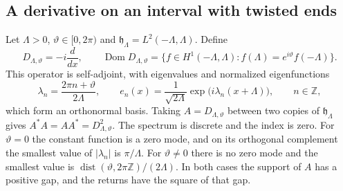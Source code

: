 \documentclass[11pt]{article}
\theoremstyle{definition}
\begin{document}
\subsection{A derivative on an interval with twisted ends}
\label{subsec:four-maps-interval}

Let $\Lambda>0$, $\vartheta\in[0,2\pi)$ and $\mathfrak h_\Lambda=L^2(-\Lambda,\Lambda)$. Define
\begin{equation}
 D_{\Lambda,\vartheta}=-i\frac{d}{dx},\qquad
 \operatorname{Dom}D_{\Lambda,\vartheta}=\bigl\{f\in H^1(-\Lambda,\Lambda):f(\Lambda)=e^{i\vartheta}f(-\Lambda)\bigr\}.
 \label{eq:four-maps-interval-operator}
\end{equation}
This operator is self-adjoint, with eigenvalues and normalized eigenfunctions
\begin{equation}
 \lambda_n=\frac{2\pi n+\vartheta}{2\Lambda},\qquad
 e_n(x)=\frac{1}{\sqrt{2\Lambda}}\exp\bigl(i\lambda_n(x+\Lambda)\bigr),\qquad n\in\mathbb Z ,
 \label{eq:four-maps-interval-spectrum}
\end{equation}
which form an orthonormal basis. Taking $A=D_{\Lambda,\vartheta}$ between two copies of $\mathfrak h_\Lambda$ gives $A^*A=AA^*=D_{\Lambda,\vartheta}^2$. The spectrum is discrete and the index is zero. For $\vartheta=0$ the constant function is a zero mode, and on its orthogonal complement the smallest value of $|\lambda_n|$ is $\pi/\Lambda$. For $\vartheta\ne0$ there is no zero mode and the smallest value is $\operatorname{dist}(\vartheta,2\pi\mathbb Z)/(2\Lambda)$. In both cases the support of $A$ has a positive gap, and the returns have the square of that gap.
\end{document}
